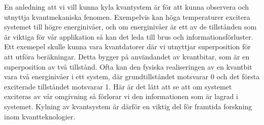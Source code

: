 En anledning att vi vill kunna kyla kvantystem är för att kunna observera och utnyttja kvantmekaniska fenomen. Exempelvis kan höga temperaturer excitera systemet till högre energinivåer, och om energinivåer är ett av de tillstånden som är viktiga för vår applikation så kan det leda till brus och informationsförluster. Ett exemepel skulle kunna vara kvantdatorer där vi utnyttjar superposition för att utföra beräkningar. Detta bygger på användandet av kvantbitar, som är en superposition av två tillstånd. Ofta kan den fysiska realiseringen av en kvantbit vara två energinivåer i ett system, där grundtillståndet motsvarar 0 och det första exciterade tillståndet motsvarar 1. Här är det lätt att se att om systemet exciteras av vår omgivning så förlorar vi den informationen som är lagrad i systemet. Kylning av kvantsystem är därför en viktig del för framtida forskning inom kvantteknologier.